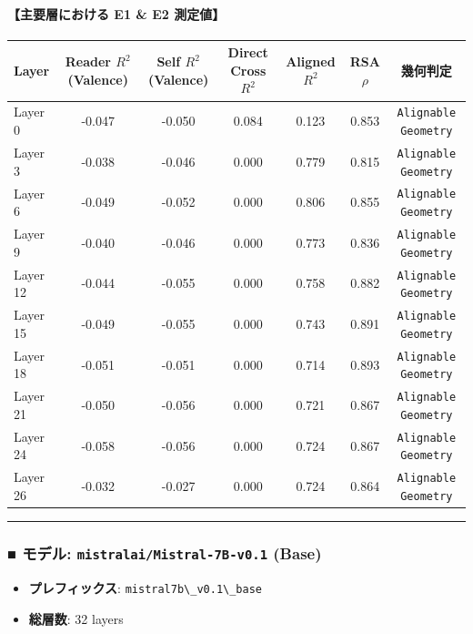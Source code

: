 \paragraph{【主要層における E1 \& E2 測定値】}
\begin{center}
\small
\begin{tabular}{lcccccc}
\toprule
\textbf{Layer} & \textbf{Reader $R^2$ (Valence)} & \textbf{Self $R^2$ (Valence)} & \textbf{Direct Cross $R^2$} & \textbf{Aligned $R^2$} & \textbf{RSA $\rho$} & \textbf{幾何判定} \\
\midrule
Layer  0 & -0.047 & -0.050 & 0.084 & 0.123 & 0.853 & \texttt{Alignable Geometry} \\
Layer  3 & -0.038 & -0.046 & 0.000 & 0.779 & 0.815 & \texttt{Alignable Geometry} \\
Layer  6 & -0.049 & -0.052 & 0.000 & 0.806 & 0.855 & \texttt{Alignable Geometry} \\
Layer  9 & -0.040 & -0.046 & 0.000 & 0.773 & 0.836 & \texttt{Alignable Geometry} \\
Layer 12 & -0.044 & -0.055 & 0.000 & 0.758 & 0.882 & \texttt{Alignable Geometry} \\
Layer 15 & -0.049 & -0.055 & 0.000 & 0.743 & 0.891 & \texttt{Alignable Geometry} \\
Layer 18 & -0.051 & -0.051 & 0.000 & 0.714 & 0.893 & \texttt{Alignable Geometry} \\
Layer 21 & -0.050 & -0.056 & 0.000 & 0.721 & 0.867 & \texttt{Alignable Geometry} \\
Layer 24 & -0.058 & -0.056 & 0.000 & 0.724 & 0.867 & \texttt{Alignable Geometry} \\
Layer 26 & -0.032 & -0.027 & 0.000 & 0.724 & 0.864 & \texttt{Alignable Geometry} \\
\bottomrule
\end{tabular}
\end{center}



\vspace{0.5em}\hrule\vspace{0.5em}

\subsubsection{■ モデル: \texttt{mistralai/Mistral-7B-v0.1} (Base)}
\begin{itemize}
\item \textbf{プレフィックス}: \texttt{mistral7b\textbackslash{}\_v0.1\textbackslash{}\_base}
\item \textbf{総層数}: 32 layers
\end{itemize}

